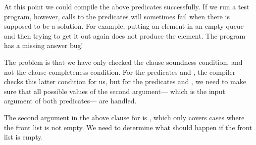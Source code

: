 At this point we could compile the above predicates successfully.
If we run a test program, however,
calls to the  predicates
will sometimes fail when there is supposed to be a solution.
For example,
putting an element in an empty queue
and then trying to get it out again
does not produce the element.
The program has a missing answer bug!

The problem is that we have only checked
the clause soundness condition,
and not the clause completeness condition.
For the  predicates  and ,
the compiler checks this latter condition for us,
but for the  predicates  and ,
we need to make sure that
all possible values of the second argument---%
which is the input argument of both predicates---%
are handled.

The second argument in the above clause for 
is ,
which only covers cases where the front list is not empty.
We need to determine what should happen if the front list is empty.

